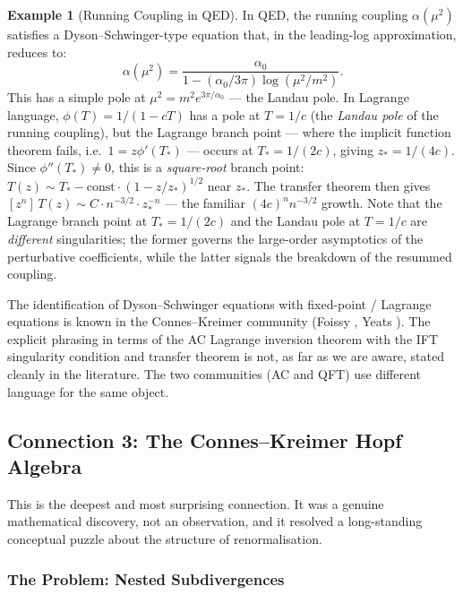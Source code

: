 \documentclass[11pt,a4paper]{article}
\theoremstyle{definition}
\newtheorem{example}[theorem]{Example}
\begin{document}
\begin{example}[Running Coupling in QED]
In QED, the running coupling $\alpha(\mu^2)$ satisfies a Dyson--Schwinger-type
equation that, in the leading-log approximation, reduces to:
\[
  \alpha(\mu^2) = \frac{\alpha_0}{1 - (\alpha_0/3\pi)\log(\mu^2/m^2)}.
\]
This has a simple pole at $\mu^2 = m^2 e^{3\pi/\alpha_0}$ --- the Landau pole.
In Lagrange language, $\phi(T) = 1/(1-cT)$ has a pole at $T = 1/c$ (the
\emph{Landau pole} of the running coupling), but the Lagrange branch point ---
where the implicit function theorem fails, i.e.\ $1 = z\phi'(T_*)$ --- occurs
at $T_* = 1/(2c)$, giving $z_* = 1/(4c)$. Since $\phi''(T_*) \neq 0$, this is
a \emph{square-root} branch point: $T(z) \sim T_* - \mathrm{const}\cdot(1 - z/z_*)^{1/2}$
near $z_*$. The transfer theorem then gives $[z^n]\,T(z) \sim C \cdot n^{-3/2} \cdot z_*^{-n}$
--- the familiar $(4c)^n n^{-3/2}$ growth. Note that the Lagrange branch point
at $T_* = 1/(2c)$ and the Landau pole at $T = 1/c$ are \emph{different}
singularities; the former governs the large-order asymptotics of the perturbative
coefficients, while the latter signals the breakdown of the resummed coupling.
\end{example}

\begin{resultbox}[Status]
The identification of Dyson--Schwinger equations with fixed-point / Lagrange
equations is known in the Connes--Kreimer community
(Foissy \cite{foissy2007}, Yeats \cite{yeats2017}).
The explicit phrasing in terms of the AC Lagrange inversion theorem
with the IFT singularity condition and transfer theorem is not, as far as
we are aware, stated cleanly in the literature. The two communities (AC and
QFT) use different language for the same object.
\end{resultbox}

\subsection{Connection 3: The Connes--Kreimer Hopf Algebra}
\label{sec:ck}

This is the deepest and most surprising connection. It was a genuine
mathematical discovery, not an observation, and it resolved a long-standing
conceptual puzzle about the structure of renormalisation.

\subsubsection{The Problem: Nested Subdivergences}
\end{document}
